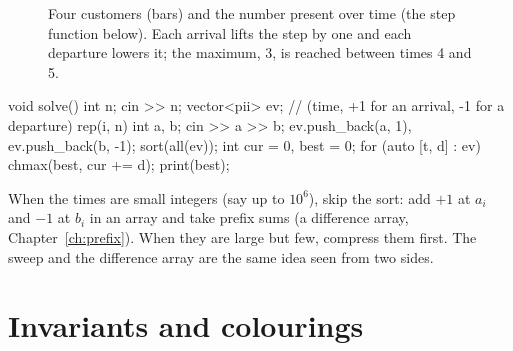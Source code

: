 \begin{figure}[htbp]
\centering
{}
\caption{Four customers (bars) and the number present over time (the step function below). Each arrival lifts the step
by one and each departure lowers it; the maximum, 3, is reached between times 4 and 5.}
\label{fig:sweep}
\end{figure}

\begin{code}
void solve() {
    int n;
    cin >> n;
    vector<pii> ev;  // (time, +1 for an arrival, -1 for a departure)
    rep(i, n) {
        int a, b;
        cin >> a >> b;
        ev.push_back({a, 1}), ev.push_back({b, -1});
    }
    sort(all(ev));
    int cur = 0, best = 0;
    for (auto [t, d] : ev) chmax(best, cur += d);
    print(best);
}
\end{code}

\begin{trick}
When the times are small integers (say up to $10^6$), skip the sort: add $+1$ at $a_i$ and $-1$ at $b_i$ in an array and
take prefix sums (a difference array, Chapter~\ref{ch:prefix}). When they are large but few, compress them first. The sweep
and the difference array are the same idea seen from two sides.
\end{trick}

\section[Invariants and colourings]{Invariants and colourings \hfill \silver}\label{sec:invariants}

